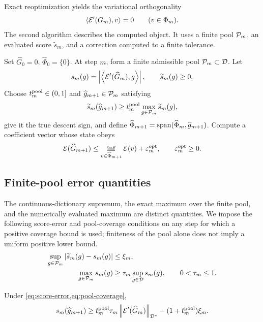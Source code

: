 Exact reoptimization yields the variational orthogonality
\begin{equation}
 \left\langle \mathcal{E}'(G_m),v\right\rangle=0\qquad(v\in\Phi_m).
 \label{eq:orthogonality}
\end{equation}
The second algorithm describes the computed object. It uses a finite pool \(\mathcal{P}_m\), an evaluated
score \(\widetilde s_m\), and a correction computed to a finite tolerance.

\begin{algorithm}[htbp]
\caption{Finite-pool inexact CGA}
\label{alg:finite}
Set \(\widehat G_0=0\), \(\widehat\Phi_0=\{0\}\). At step \(m\), form a finite admissible pool
\(\mathcal{P}_m\subset\mathcal{D}\). Let
\[
 s_m(g)=\left\lvert \left\langle \mathcal{E}'(\widehat G_m),g\right\rangle\right\rvert,
 \qquad \widetilde s_m(g)\geq0.
\]
Choose \(t_m^{\rm pool}\in(0,1]\) and \(\widehat g_{m+1}\in\mathcal{P}_m\) satisfying
\[
 \widetilde s_m(\widehat g_{m+1})
 \geq t_m^{\rm pool}\max_{g\in\mathcal{P}_m}\widetilde s_m(g),
\]
give it the true descent sign, and define
\(\widehat\Phi_{m+1}=\operatorname{span}(\widehat\Phi_m,\widehat g_{m+1})\). Compute a coefficient vector whose state
obeys
\[
 \mathcal{E}(\widehat G_{m+1})
 \leq\inf_{v\in\widehat\Phi_{m+1}}\mathcal{E}(v)+\varepsilon_m^{\rm opt},
 \qquad \varepsilon_m^{\rm opt}\geq0.
\]
\end{algorithm}

\subsection{Finite-pool error quantities}
\label{sec:controlled-selection}

The continuous-dictionary supremum, the exact maximum over the finite pool, and the
numerically evaluated maximum are distinct quantities. We impose the following
score-error and pool-coverage conditions on any step for which a positive coverage
bound is used; finiteness of the pool alone does not imply a uniform positive lower bound.
\begin{align}
 \sup_{g\in\mathcal{P}_m}\left\lvert \widetilde s_m(g)-s_m(g)\right\rvert&\leq\xi_m,
 \label{eq:score-error}\\
 \max_{g\in\mathcal{P}_m}s_m(g)&\geq
 \tau_m\sup_{g\in\mathcal{D}}s_m(g),\qquad0<\tau_m\leq1.
 \label{eq:pool-coverage}
\end{align}

\begin{lemma}
\label{lem:true-score}
Under \cref{eq:score-error,eq:pool-coverage},
\begin{equation}
 s_m(\widehat g_{m+1})\geq
 t_m^{\rm pool}\tau_m\left\lVert \mathcal{E}'(\widehat G_m)\right\rVert_{\mathcal{D}^*}
 -(1+t_m^{\rm pool})\xi_m.
\label{eq:true-score-lower}
\end{equation}
\end{lemma}

